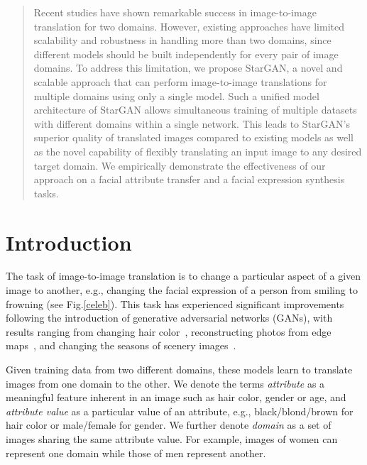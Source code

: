 \documentclass[10pt,twocolumn,letterpaper]{article}
\begin{document}
\begin{abstract}
\vspace{-.2in}
Recent studies have shown remarkable success in image-to-image translation for two domains. However, existing approaches have limited scalability and robustness in handling more than two domains, since different models should be built independently for every pair of image domains. To address this limitation, we propose StarGAN, a novel and scalable approach that can perform image-to-image translations for multiple domains using only a single model. Such a unified model architecture of StarGAN allows simultaneous training of multiple datasets with different domains within a single
network. This leads to StarGAN's superior quality of translated images
compared to existing models as well as the novel capability of flexibly translating an input image to any desired target domain. We empirically demonstrate the effectiveness of our approach on a facial attribute transfer and a facial expression synthesis tasks.
\end{abstract}

\vspace{-.2in}
\section{Introduction}

The task of image-to-image translation is to change a particular aspect of a given image to another, e.g., changing the facial expression of a person from smiling to frowning (see Fig.\thinspace\ref{celeb}). This task has experienced significant improvements following the introduction of generative adversarial networks (GANs), with results ranging from changing hair color~\cite{kim2017learning}, reconstructing photos from edge maps~\cite{Isola_2017_CVPR}, and changing the seasons of scenery images~\cite{zhu2017unpaired}. 

Given training data from two different domains, these models learn to translate images from one domain to the other. We denote the terms \textit{attribute} as a meaningful feature inherent in an image such as hair color, gender or age, and \textit{attribute value} as a particular value of an attribute, e.g., black/blond/brown for hair color or male/female for gender. We further denote \textit{domain} as a set of images sharing the same attribute value. For example, images of women can represent one domain while those of men represent another. 
\end{document}
